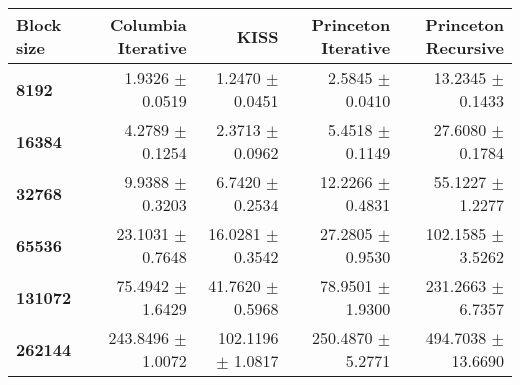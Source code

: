 \begin{tabular}{lrrrr}\toprule
\textbf{Block size}  & \textbf{Columbia Iterative} & \textbf{KISS} & \textbf{Princeton Iterative} & \textbf{Princeton Recursive}\\\midrule
\textbf{8192}  & 1.9326 $\pm$ 0.0519 & 1.2470 $\pm$ 0.0451 & 2.5845 $\pm$ 0.0410 & 13.2345 $\pm$ 0.1433\\
\textbf{16384}  & 4.2789 $\pm$ 0.1254 & 2.3713 $\pm$ 0.0962 & 5.4518 $\pm$ 0.1149 & 27.6080 $\pm$ 0.1784\\
\textbf{32768}  & 9.9388 $\pm$ 0.3203 & 6.7420 $\pm$ 0.2534 & 12.2266 $\pm$ 0.4831 & 55.1227 $\pm$ 1.2277\\
\textbf{65536}  & 23.1031 $\pm$ 0.7648 & 16.0281 $\pm$ 0.3542 & 27.2805 $\pm$ 0.9530 & 102.1585 $\pm$ 3.5262\\
\textbf{131072}  & 75.4942 $\pm$ 1.6429 & 41.7620 $\pm$ 0.5968 & 78.9501 $\pm$ 1.9300 & 231.2663 $\pm$ 6.7357\\
\textbf{262144} & 243.8496 $\pm$ 1.0072 & 102.1196 $\pm$ 1.0817 & 250.4870 $\pm$ 5.2771 & 494.7038 $\pm$ 13.6690\\
\bottomrule
\end{tabular}
